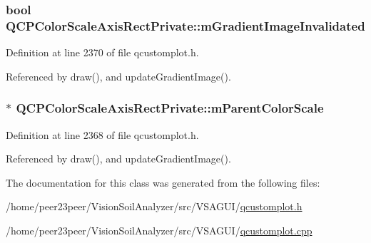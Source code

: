 \subsubsection[{m\+Gradient\+Image\+Invalidated}]{\setlength{\rightskip}{0pt plus 5cm}bool Q\+C\+P\+Color\+Scale\+Axis\+Rect\+Private\+::m\+Gradient\+Image\+Invalidated\hspace{0.3cm}{\ttfamily [protected]}}\label{class_q_c_p_color_scale_axis_rect_private_a2c0b15b071e1f93006b48b5be022a631}


Definition at line 2370 of file qcustomplot.\+h.



Referenced by draw(), and update\+Gradient\+Image().

\hypertarget{class_q_c_p_color_scale_axis_rect_private_a311c73f51a4cb0b556388197833cf099}{}
\subsubsection[{m\+Parent\+Color\+Scale}]{$\ast$ Q\+C\+P\+Color\+Scale\+Axis\+Rect\+Private\+::m\+Parent\+Color\+Scale\hspace{0.3cm}{\ttfamily [protected]}}\label{class_q_c_p_color_scale_axis_rect_private_a311c73f51a4cb0b556388197833cf099}


Definition at line 2368 of file qcustomplot.\+h.



Referenced by draw(), and update\+Gradient\+Image().



The documentation for this class was generated from the following files\+:\begin{DoxyCompactItemize}
\item 
/home/peer23peer/\+Vision\+Soil\+Analyzer/src/\+V\+S\+A\+G\+U\+I/\hyperlink{qcustomplot_8h}{qcustomplot.\+h}\item 
/home/peer23peer/\+Vision\+Soil\+Analyzer/src/\+V\+S\+A\+G\+U\+I/\hyperlink{qcustomplot_8cpp}{qcustomplot.\+cpp}\end{DoxyCompactItemize}
